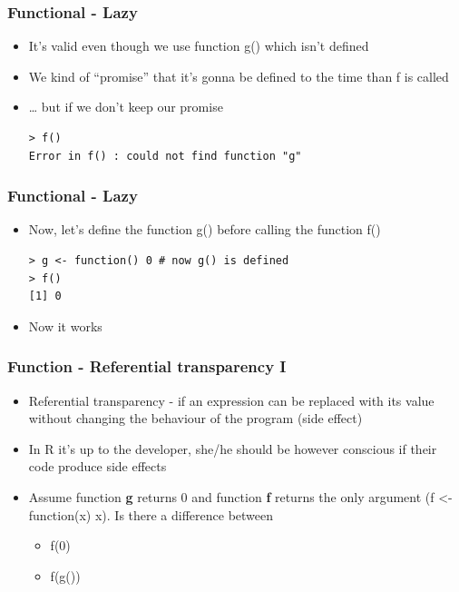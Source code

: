 \documentclass[bigger]{beamer}
\begin{document}
\begin{frame}[fragile]
\frametitle{Functional - Lazy}
\label{sec-3-5}
\begin{itemize}

\item It's valid even though we use function g() which isn't defined
\label{sec-3-5-1}%

\item We kind of ``promise'' that it's gonna be defined to the time than f is called
\label{sec-3-5-2}%

\item \ldots{} but if we don't keep our promise\\
\label{sec-3-5-3}%
\begin{verbatim}
> f()
Error in f() : could not find function "g"
\end{verbatim}


\end{itemize} %
\end{frame}
\begin{frame}[fragile]
\frametitle{Functional - Lazy}
\label{sec-3-6}
\begin{itemize}

\item Now, let's define the function g() before calling the function f()\\
\label{sec-3-6-1}%
\begin{verbatim}
> g <- function() 0 # now g() is defined
> f()
[1] 0
\end{verbatim}



\item Now it works
\label{sec-3-6-2}%
\end{itemize} %
\end{frame}
\begin{frame}
\frametitle{Function - Referential transparency I}
\label{sec-3-7}
\begin{itemize}

\item Referential transparency - if an expression can be replaced with its value without changing the behaviour of the program (side effect)
\label{sec-3-7-1}%

\item In R it's up to the developer, she/he should be however conscious if their code produce side effects
\label{sec-3-7-2}%

\item Assume function \textbf{g} returns 0 and function \textbf{f} returns the only argument (f <- function(x) x). Is there a difference between
\label{sec-3-7-3}%
\begin{itemize}

\item f(0)
\label{sec-3-7-3-1}%

\item f(g())
\label{sec-3-7-3-2}%
\end{itemize} %
\end{itemize} %
\end{frame}
\end{document}
